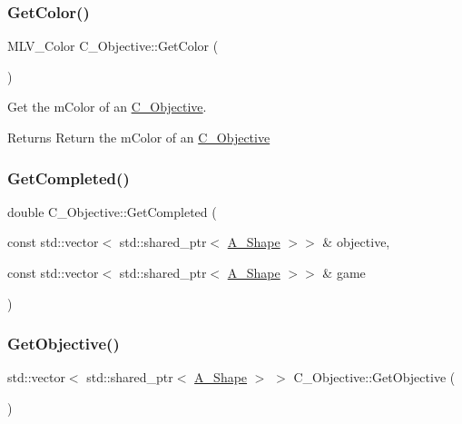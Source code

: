 \subsubsection{\texorpdfstring{Get\+Color()}{GetColor()}}
{\footnotesize\ttfamily M\+L\+V\+\_\+\+Color C\+\_\+\+Objective\+::\+Get\+Color (\begin{DoxyParamCaption}{ }\end{DoxyParamCaption})}



Get the m\+Color of an \hyperlink{classC__Objective}{C\+\_\+\+Objective}. 

\begin{DoxyReturn}{Returns}
Return the m\+Color of an \hyperlink{classC__Objective}{C\+\_\+\+Objective} 
\end{DoxyReturn}
\mbox{\label{classC__Objective_a026149982f0d62ea0a039a8b94bbaae0}} 
\subsubsection{\texorpdfstring{Get\+Completed()}{GetCompleted()}}
{\footnotesize\ttfamily double C\+\_\+\+Objective\+::\+Get\+Completed (\begin{DoxyParamCaption}\item[{const std\+::vector$<$ std\+::shared\+\_\+ptr$<$ \hyperlink{classA__Shape}{A\+\_\+\+Shape} $>$$>$ \&}]{objective,  }\item[{const std\+::vector$<$ std\+::shared\+\_\+ptr$<$ \hyperlink{classA__Shape}{A\+\_\+\+Shape} $>$$>$ \&}]{game }\end{DoxyParamCaption})}

\mbox{\label{classC__Objective_aa8e3dea19bd4578246b183d2bad2d475}} 
\subsubsection{\texorpdfstring{Get\+Objective()}{GetObjective()}}
{\footnotesize\ttfamily std\+::vector$<$ std\+::shared\+\_\+ptr$<$ \hyperlink{classA__Shape}{A\+\_\+\+Shape} $>$ $>$ C\+\_\+\+Objective\+::\+Get\+Objective (\begin{DoxyParamCaption}{ }\end{DoxyParamCaption})}



